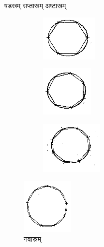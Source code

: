 \documentclass[11pt, openany]{book}
\begin{document}
\begin{center}
षडस्रम् \hspace{28mm} सप्तास्रम् \hspace{28mm} अष्टास्रम्
\end{center}
\vspace{-6mm}

\begin{figure}[h!]
     \centering
     \begin{subfigure}[b]{0.3\textwidth}
         \centering
          \captionsetup{labelformat=empty}
         \includegraphics[scale=0.85]{graphics/capture84'.png}
     \end{subfigure}
     \hfill
     \begin{subfigure}[b]{0.3\textwidth}
         \centering
        \captionsetup{labelformat=empty}
         \includegraphics[scale=0.85]{graphics/capture84''.png}
     \end{subfigure}
     \hfill
     \begin{subfigure}[b]{0.3\textwidth}
         \centering
       \captionsetup{labelformat=empty}
         \includegraphics[scale=0.85]{graphics/capture84'''.png}
     \end{subfigure}
\end{figure}

\newpage
\begin{figure}[h!]
    \centering
  \captionsetup{labelformat=empty}
 \caption{नवास्रम्}
\vspace{-2mm}
    \includegraphics[scale=0.85]{graphics/capture85.png}
\end{figure}
\vspace{2mm}
\end{document}
